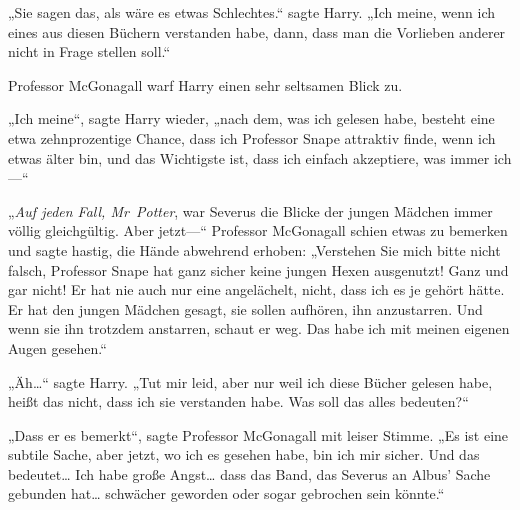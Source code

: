 „Sie sagen das, als wäre es etwas Schlechtes.“ sagte Harry. „Ich meine, wenn ich eines aus diesen Büchern verstanden habe, dann, dass man die Vorlieben anderer nicht in Frage stellen soll.“

Professor McGonagall warf Harry einen sehr seltsamen Blick zu.

„Ich meine“, sagte Harry wieder, „nach dem, was ich gelesen habe, besteht eine etwa zehnprozentige Chance, dass ich Professor Snape attraktiv finde, wenn ich etwas älter bin, und das Wichtigste ist, dass ich einfach akzeptiere, was immer ich—“

„\emph{Auf jeden Fall, Mr~Potter}, war Severus die Blicke der jungen Mädchen immer völlig gleichgültig. Aber jetzt—“ Professor McGonagall schien etwas zu bemerken und sagte hastig, die Hände abwehrend erhoben: „Verstehen Sie mich bitte nicht falsch, Professor Snape hat ganz sicher keine jungen Hexen ausgenutzt! Ganz und gar nicht! Er hat nie auch nur eine angelächelt, nicht, dass ich es je gehört hätte. Er hat den jungen Mädchen gesagt, sie sollen aufhören, ihn anzustarren. Und wenn sie ihn trotzdem anstarren, schaut er weg. Das habe ich mit meinen eigenen Augen gesehen.“

„Äh…“ sagte Harry. „Tut mir leid, aber nur weil ich diese Bücher gelesen habe, heißt das nicht, dass ich sie verstanden habe. Was soll das alles bedeuten?“

„Dass er es bemerkt“, sagte Professor McGonagall mit leiser Stimme. „Es ist eine subtile Sache, aber jetzt, wo ich es gesehen habe, bin ich mir sicher. Und das bedeutet… Ich habe große Angst… dass das Band, das Severus an Albus' Sache gebunden hat… schwächer geworden oder sogar gebrochen sein könnte.“

